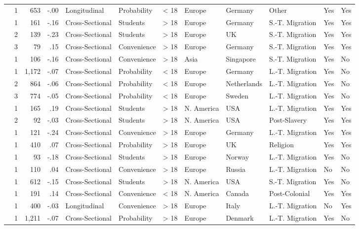 \documentclass[10pt, letterpaper]{article}
\begin{document}
\begin{landscape}
\begin{xltabular}{650pt}{Xrrrllrlllll}
\cite{401} & 1 & 653 & -.00 & Longitudinal & Probability & < 18 & Europe & Germany & Other & Yes & Yes\\
\cite{45} & 1 & 161 & -.16 & Cross-Sectional & Students & > 18 & Europe & Germany & S.-T. Migration & Yes & Yes\\
 & 2 & 139 & -.23 & Cross-Sectional & Students & > 18 & Europe & UK & S.-T. Migration & Yes & Yes\\
 & 3 & 79 & .15 & Cross-Sectional & Convenience & > 18 & Europe & Germany & S.-T. Migration & Yes & Yes\\
\cite{1993} & 1 & 106 & -.16 & Cross-Sectional & Convenience & > 18 & Asia & Singapore & S.-T. Migration & Yes & No\\
\cite{3134} & 1 & 1,172 & -.07 & Cross-Sectional & Probability & < 18 & Europe & Germany & L.-T. Migration & Yes & No\\
 & 2 & 864 & -.06 & Cross-Sectional & Probability & < 18 & Europe & Netherlands & L.-T. Migration & Yes & No\\
 & 3 & 774 & -.05 & Cross-Sectional & Probability & < 18 & Europe & Sweden & L.-T. Migration & Yes & No\\
\cite{1042} & 1 & 165 & .19 & Cross-Sectional & Students & > 18 & N. America & USA & L.-T. Migration & Yes & Yes\\
 & 2 & 92 & -.03 & Cross-Sectional & Students & > 18 & N. America & USA & Post-Slavery & Yes & Yes\\
\cite{4000} & 1 & 121 & -.24 & Cross-Sectional & Convenience & > 18 & Europe & Germany & L.-T. Migration & Yes & Yes\\
\cite{893} & 1 & 410 & .07 & Cross-Sectional & Probability & > 18 & Europe & UK & Religion & Yes & Yes\\
\cite{3005} & 1 & 93 & -.18 & Cross-Sectional & Students & > 18 & Europe & Norway & L.-T. Migration & Yes & No\\
\cite{1850} & 1 & 110 & .04 & Cross-Sectional & Convenience & > 18 & Europe & Russia & L.-T. Migration & No & No\\
\cite{823} & 1 & 612 & -.15 & Cross-Sectional & Students & > 18 & N. America & USA & S.-T. Migration & Yes & No\\
\cite{1762} & 1 & 191 & .14 & Cross-Sectional & Convenience & < 18 & N. America & Canada & Post-Colonial & Yes & Yes\\
\cite{2391} & 1 & 400 & -.03 & Longitudinal & Convenience & > 18 & Europe & Italy & L.-T. Migration & No & Yes\\
\cite{3051} & 1 & 1,211 & -.07 & Cross-Sectional & Probability & > 18 & Europe & Denmark & L.-T. Migration & Yes & No\\

\end{xltabular}
\end{landscape}
\end{document}
